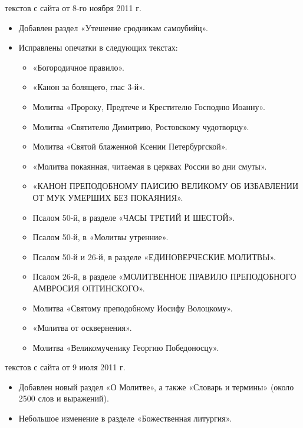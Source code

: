 {

{ текстов с сайта от 8-го ноября 2011 г.

\begin{itemize}

\item Добавлен раздел «Утешение сродникам самоубийц».
\item Исправлены опечатки в следующих текстах:

\begin{itemize}

\item «Богородичное правило».
\item «Канон за болящего, глас 3-й».
\item Молитва «Пророку, Предтече и Крестителю Господню Иоанну».
\item Молитва «Святителю Димитрию, Ростовскому чудотворцу».
\item Молитва «Святой блаженной Ксении Петербургской».
\item «Молитва покаянная, читаемая в церквах России во дни смуты».
\item «КАНОН ПРЕПОДОБНОМУ ПАИСИЮ ВЕЛИКОМУ ОБ ИЗБАВЛЕНИИ ОТ МУК УМЕРШИХ БЕЗ ПОКАЯНИЯ».
\item Псалом 50-й, в разделе «ЧАСЫ ТРЕТИЙ И ШЕСТОЙ».
\item Псалом 50-й, в «Молитвы утренние».
\item Псалом 50-й и 26-й, в разделе «ЕДИНОВЕРЧЕСКИЕ МОЛИТВЫ».
\item Псалом 26-й, в разделе «МОЛИТВЕННОЕ ПРАВИЛО ПРЕПОДОБНОГО АМВРОСИЯ OПТИНСКОГО».
\item Молитва «Святому преподобному Иосифу Волоцкому».
\item «Молитва от осквернения».
\item Молитва «Великомученику Георгию Победоносцу».
\end{itemize}

\end{itemize}}


{ текстов с сайта от 9 июля 2011 г.

\begin{itemize}

\item Добавлен новый раздел «О Молитве», а также «Словарь и термины» (около 2500 слов и выражений).

\item Небольшое изменение в разделе «Божественная литургия».


\end{itemize}}}

